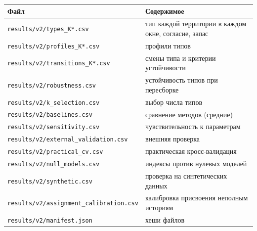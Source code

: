\documentclass[11pt,a4paper]{article}
\newcounter{none}\def\LTcaptype{none}
\begin{document}
{\def\LTcaptype{none} %
\begin{longtable}[]{@{}
  >{\raggedright\arraybackslash}p{}
  >{\raggedright\arraybackslash}p{}@{}}
\toprule\noalign{}
\begin{minipage}[b]{\linewidth}\raggedright
Файл
\end{minipage} & \begin{minipage}[b]{\linewidth}\raggedright
Содержимое
\end{minipage} \\
\midrule\noalign{}
\endhead
\bottomrule\noalign{}
\endlastfoot
\texttt{results/\allowbreak{}v2/\allowbreak{}types\_\allowbreak{}K*.\allowbreak{}csv} & тип каждой территории в каждом окне, согласие, запас \\
\texttt{results/\allowbreak{}v2/\allowbreak{}profiles\_\allowbreak{}K*.\allowbreak{}csv} & профили типов \\
\texttt{results/\allowbreak{}v2/\allowbreak{}transitions\_\allowbreak{}K*.\allowbreak{}csv} & смены типа и критерии устойчивости \\
\texttt{results/\allowbreak{}v2/\allowbreak{}robustness.\allowbreak{}csv} & устойчивость типов при пересборке \\
\texttt{results/\allowbreak{}v2/\allowbreak{}k\_\allowbreak{}selection.\allowbreak{}csv} & выбор числа типов \\
\texttt{results/\allowbreak{}v2/\allowbreak{}baselines.\allowbreak{}csv} & сравнение методов (средние) \\
\texttt{results/\allowbreak{}v2/\allowbreak{}sensitivity.\allowbreak{}csv} & чувствительность к параметрам \\
\texttt{results/\allowbreak{}v2/\allowbreak{}external\_\allowbreak{}validation.\allowbreak{}csv} & внешняя проверка \\
\texttt{results/\allowbreak{}v2/\allowbreak{}practical\_\allowbreak{}cv.\allowbreak{}csv} & практическая кросс-валидация \\
\texttt{results/\allowbreak{}v2/\allowbreak{}null\_\allowbreak{}models.\allowbreak{}csv} & индексы против нулевых моделей \\
\texttt{results/\allowbreak{}v2/\allowbreak{}synthetic.\allowbreak{}csv} & проверка на синтетических данных \\
\texttt{results/\allowbreak{}v2/\allowbreak{}assignment\_\allowbreak{}calibration.\allowbreak{}csv} & калибровка присвоения неполным историям \\
\texttt{results/\allowbreak{}v2/\allowbreak{}manifest.\allowbreak{}json} & хеши файлов \\
\end{longtable}
}
\end{document}
